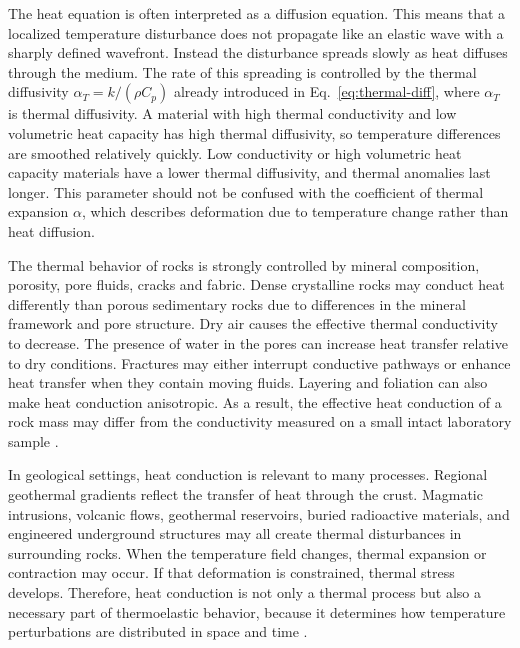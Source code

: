 The heat equation is often interpreted as a diffusion equation. This means that a localized temperature disturbance does not propagate like an elastic wave with a sharply defined wavefront. Instead the disturbance spreads slowly as heat diffuses through the medium. The rate of this spreading is controlled by the thermal diffusivity $\alpha_T = k/(\rho C_p)$ already introduced in Eq.~\eqref{eq:thermal-diff},
where \(\alpha_T\) is thermal diffusivity. A material with high thermal conductivity and low volumetric heat capacity has high thermal diffusivity, so temperature differences are smoothed relatively quickly. Low conductivity or high volumetric heat capacity materials have a lower thermal diffusivity, and thermal anomalies last longer. This parameter should not be confused with the coefficient of thermal expansion \(\alpha\), which describes deformation due to temperature change rather than heat diffusion\cite{robertson1988,turcotte2014}.

The thermal behavior of rocks is strongly controlled by mineral composition, porosity, pore fluids, cracks and fabric. Dense crystalline rocks may conduct heat differently than porous sedimentary rocks due to differences in the mineral framework and pore structure. Dry air causes the effective thermal conductivity to decrease. The presence of water in the pores can increase heat transfer relative to dry conditions. Fractures may either interrupt conductive pathways or enhance heat transfer when they contain moving fluids. Layering and foliation can also make heat conduction anisotropic. As a result, the effective heat conduction of a rock mass may differ from the conductivity measured on a small intact laboratory sample \cite{robertson1988,wolff1982,mavko2009}.

In geological settings, heat conduction is relevant to many processes. Regional geothermal gradients reflect the transfer of heat through the crust. Magmatic intrusions, volcanic flows, geothermal reservoirs, buried radioactive materials, and engineered underground structures may all create thermal disturbances in surrounding rocks. When the temperature field changes, thermal expansion or contraction may occur. If that deformation is constrained, thermal stress develops. Therefore, heat conduction is not only a thermal process but also a necessary part of thermoelastic behavior, because it determines how temperature perturbations are distributed in space and time \cite{turcotte2014,robertson1988,boley1960}.

